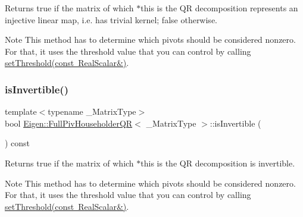 \begin{DoxyReturn}{Returns}
true if the matrix of which $\ast$this is the QR decomposition represents an injective linear map, i.\+e. has trivial kernel; false otherwise.
\end{DoxyReturn}
\begin{DoxyNote}{Note}
This method has to determine which pivots should be considered nonzero. For that, it uses the threshold value that you can control by calling \mbox{\hyperlink{class_eigen_1_1_full_piv_householder_q_r_a92277e572bf98245891015d12dd2b602}{set\+Threshold(const Real\+Scalar\&)}}. 
\end{DoxyNote}
\mbox{\label{class_eigen_1_1_full_piv_householder_q_r_aeb1d779ec22ec68a5a28d4235db02ec1}} 
\subsubsection{\texorpdfstring{isInvertible()}{isInvertible()}}
{\footnotesize\ttfamily template$<$typename \+\_\+\+Matrix\+Type$>$ \\
bool \mbox{\hyperlink{class_eigen_1_1_full_piv_householder_q_r}{Eigen\+::\+Full\+Piv\+Householder\+QR}}$<$ \+\_\+\+Matrix\+Type $>$\+::is\+Invertible (\begin{DoxyParamCaption}{ }\end{DoxyParamCaption}) const\hspace{0.3cm}{\ttfamily [inline]}}

\begin{DoxyReturn}{Returns}
true if the matrix of which $\ast$this is the QR decomposition is invertible.
\end{DoxyReturn}
\begin{DoxyNote}{Note}
This method has to determine which pivots should be considered nonzero. For that, it uses the threshold value that you can control by calling \mbox{\hyperlink{class_eigen_1_1_full_piv_householder_q_r_a92277e572bf98245891015d12dd2b602}{set\+Threshold(const Real\+Scalar\&)}}. 
\end{DoxyNote}
\mbox{\label{class_eigen_1_1_full_piv_householder_q_r_aa3593db4708ce9079b0bdf219b99f57e}} 
